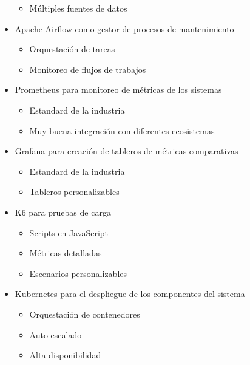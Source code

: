 \begin{itemize}
\begin{itemize}
           \item Múltiples fuentes de datos
       \end{itemize}
    \item Apache Airflow como gestor de procesos de mantenimiento
       \begin{itemize}
           \item Orquestación de tareas
           \item Monitoreo de flujos de trabajos
       \end{itemize}
    \item Prometheus para monitoreo de métricas de los sistemas
       \begin{itemize}
           \item Estandard de la industria
           \item Muy buena integración con diferentes ecosistemas
       \end{itemize}
    \item Grafana para creación de tableros de métricas comparativas
       \begin{itemize}
            \item Estandard de la industria
            \item Tableros personalizables
       \end{itemize}
    \item K6 para pruebas de carga
       \begin{itemize}
           \item Scripts en JavaScript
           \item Métricas detalladas
           \item Escenarios personalizables
       \end{itemize}
    \item Kubernetes para el despliegue de los componentes del sistema
       \begin{itemize}
           \item Orquestación de contenedores
           \item Auto-escalado
           \item Alta disponibilidad
       \end{itemize}
   \end{itemize}
\newpage